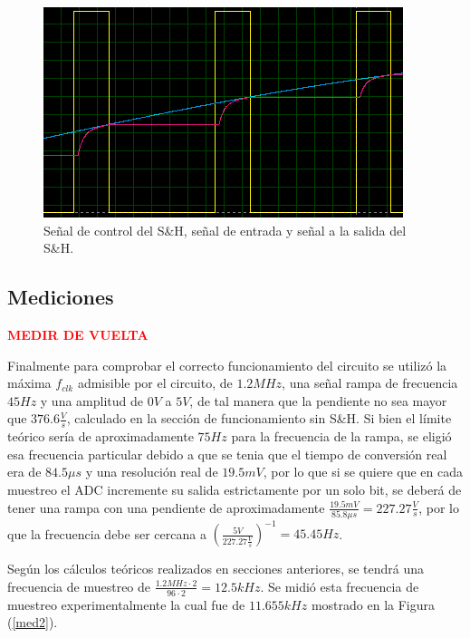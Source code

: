 \begin{figure}[H]
\centering
\includegraphics[width=0.8\linewidth, page=1]{ImagenesEjercicio1/S_H.png}
\caption{Señal de control del S\&H, señal de entrada y señal a la salida del S\&H.}
\label{sh}
\end{figure}

\subsection{Mediciones}
\begin{center}
	\LARGE{\textcolor{red}{\textbf{MEDIR DE VUELTA}}}
\end{center}

Finalmente para comprobar el correcto funcionamiento del circuito se utilizó la máxima $f_{clk}$ admisible por el circuito, de $1.2MHz$, una señal rampa de frecuencia $45Hz$ y una amplitud de $0V$ a $5V$, de tal manera que la pendiente no sea mayor que $376.6\frac{V}{s}$, calculado en la sección de funcionamiento sin S\&H. Si bien el límite teórico sería de aproximadamente $75Hz$ para la frecuencia de la rampa, se eligió esa frecuencia particular debido a que se tenia que el tiempo de conversión real era de $84.5\mu s$ y una resolución real de $19.5 mV$, por lo que si se quiere que en cada muestreo el ADC incremente su salida estrictamente por un solo bit, se deberá de tener una rampa con una pendiente de aproximadamente $\frac{19.5mV}{85.8\mu s} = 227.27 \frac{V}{s}$, por lo que la frecuencia debe ser cercana a $\left(\frac{5V}{227.27\frac{V}{s}}\right)^{-1} = 45.45Hz$.

Según los cálculos teóricos realizados en secciones anteriores, se tendrá una frecuencia de muestreo de $\frac{1.2MHz \cdot 2}{96 \cdot 2} = 12.5kHz$. Se midió esta frecuencia de muestreo experimentalmente la cual fue de $11.655kHz$ mostrado en la Figura (\ref{med2}).


